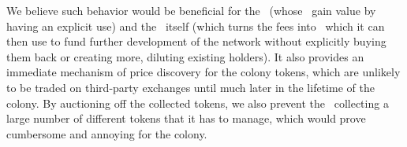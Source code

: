 We believe such behavior would be beneficial for the \rcths\ (whose \rcts\ gain value by having an explicit use) and the \rc\ itself (which turns the fees into \rcts\ which it can then use to fund further development of the network without explicitly buying them back or creating more, diluting existing holders). It also provides an immediate mechanism of price discovery for the colony tokens, which are unlikely to be traded on third-party exchanges until much later in the lifetime of the colony. By auctioning off the collected tokens, we also prevent the \rc\ collecting a large number of different tokens that it has to manage, which would prove cumbersome and annoying for the colony.



